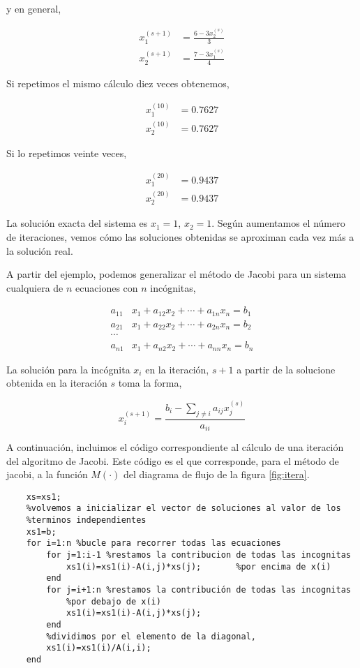 y en general,

\begin{align*}
x_1^{(s+1)}&=\frac{6-3x_2^{(s)}}{3}\\
x_2^{(s+1)}&=\frac{7-3x_1^{(s)}}{4}
\end{align*}

Si repetimos el mismo cálculo diez veces obtenemos,

\begin{align*}
x_1^{(10)}&=0.7627\\
x_2^{(10)}&=0.7627
\end{align*}

Si lo repetimos veinte veces,

\begin{align*}
x_1^{(20)}&=0.9437\\
x_2^{(20)}&=0.9437
\end{align*}

La solución exacta del sistema es $x_1=1$, $x_2=1$. Según aumentamos el número de iteraciones, vemos cómo las soluciones obtenidas se aproximan cada vez más a la solución real.

A partir del ejemplo, podemos generalizar el método de Jacobi para un sistema cualquiera de $n$ ecuaciones con $n$ incógnitas,

\begin{align*}
a_{11}&x_1+a_{12}x_2+\cdots +a_{1n}x_n=b_1\\
a_{21}&x_1+a_{22}x_2+\cdots +a_{2n}x_n=b_2\\
\cdots & \\
a_{n1}&x_1+a_{n2}x_2+\cdots +a_{nn}x_n=b_n
\end{align*}

La solución para la incógnita $x_i$ en la iteración, $s+1$ a partir de la solucione obtenida en la iteración $s$ toma la forma,

\begin{equation*}
x_i^{(s+1)}=\frac{b_i-\sum_{j\neq i}a_{ij}x_j^{(s)}}{a_{ii}}
\end{equation*}

A continuación, incluimos el código correspondiente al cálculo de una iteración del algoritmo de Jacobi. Este código es el que corresponde, para el método de jacobi, a la función $M(\cdot)$ del diagrama de flujo de la figura \ref{fig:itera}.

\begin{verbatim}
 	xs=xs1;
    %volvemos a inicializar el vector de soluciones al valor de los
    %terminos independientes
    xs1=b; 
    for i=1:n %bucle para recorrer todas las ecuaciones
        for j=1:i-1 %restamos la contribucion de todas las incognitas
            xs1(i)=xs1(i)-A(i,j)*xs(j);       %por encima de x(i)
        end
        for j=i+1:n %restamos la contribución de todas las incognitas
            %por debajo de x(i)
            xs1(i)=xs1(i)-A(i,j)*xs(j);
        end
        %dividimos por el elemento de la diagonal,
        xs1(i)=xs1(i)/A(i,i);
    end
\end{verbatim}

